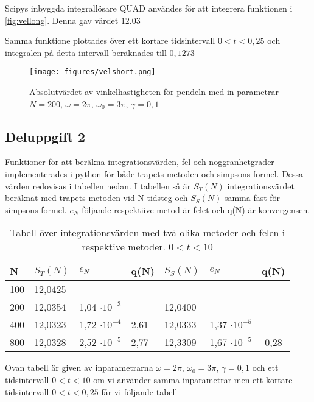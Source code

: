\documentclass[12pt]{article}
\begin{document}
Scipys inbyggda integrallösare QUAD användes för att integrera funktionen i \ref{fig:vellong}. Denna gav värdet $12.03$

Samma funktione plottades över ett kortare tidsintervall $0<t<0,25$ och integralen på detta intervall beräknades till $0,1273$

\begin{figure}[H]
  \begin{small}
    \begin{center}
      \texttt{[image: figures/velshort.png]}
    \end{center}
    \caption{Absolutvärdet av vinkelhastigheten för pendeln med in parametrar $N = 200$, $\omega = 2\pi$,  $\omega_0 = 3\pi$, $\gamma = 0,1$}
    \label{fig:velshort}
  \end{small}
\end{figure}

\subsection{Deluppgift 2}

Funktioner för att beräkna integrationsvärden, fel och noggranhetgrader implementerades i python för både trapets metoden och simpsons formel. Dessa värden redovisas i tabellen nedan. I tabellen så är $S_T(N)$ integrationsvärdet beräknat med trapets metoden vid N tidsteg och $S_S(N)$ samma fast för simpsons formel. $e_N$ följande respektiive metod är felet och q(N) är konvergensen. 

\begin{table}[H]
  \caption{Tabell över integrationsvärden med två olika metoder och felen i respektive metoder. $0<t<10$}
  \label{tab:TSL}
    \begin{tabular}{lllllll}
      \hline
      N   & $S_T(N)$ & $e_N$ & q(N) & $S_S(N)$ & $e_N$ & q(N) \\ \hline
      100 & 12,0425 &  &  &  &  &  \\
      200 & 12,0354 & 1,04 $\cdot 10^{-3}$ &  & 12,0400 &  &  \\
      400 & 12,0323 & 1,72 $\cdot 10^{-4}$ & 2,61 & 12,0333 & 1,37 $\cdot 10^{-5}$ &  \\
      800 & 12,0328 & 2,52 $\cdot 10^{-5}$ & 2,77 & 12,3309 & 1,67 $\cdot 10^{-5}$ & -0,28 \\ \hline
    \end{tabular}
\end{table}

Ovan tabell är given av inparametrarna $\omega = 2\pi$,  $\omega_0 = 3\pi$, $\gamma = 0,1$ och ett tidsintervall $0<t<10$ om vi använder samma inparametrar men ett kortare tidsintervall $0<t<0,25$ får vi följande tabell
\end{document}
